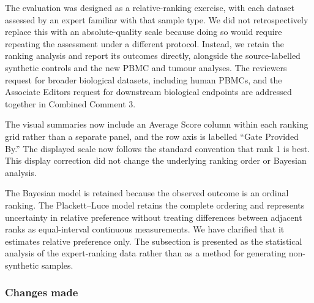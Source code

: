 \documentclass[
  11pt,
  a4paper,
]{article}
\begin{document}
The evaluation was designed as a relative-ranking exercise, with each
dataset assessed by an expert familiar with that sample type. We did not
retrospectively replace this with an absolute-quality scale because
doing so would require repeating the assessment under a different
protocol. Instead, we retain the ranking analysis and report its
outcomes directly, alongside the source-labelled synthetic controls and
the new PBMC and tumour analyses. The reviewer\textquotesingle s request
for broader biological datasets, including human PBMCs, and the
Associate Editor\textquotesingle s request for downstream biological
endpoints are addressed together in Combined Comment 3.

The visual summaries now include an Average Score column within each
ranking grid rather than a separate panel, and the row axis is labelled
``Gate Provided By.'' The displayed scale now follows the standard
convention that rank 1 is best. This display correction did not change
the underlying ranking order or Bayesian analysis.

The Bayesian model is retained because the observed outcome is an
ordinal ranking. The Plackett--Luce model retains the complete ordering
and represents uncertainty in relative preference without treating
differences between adjacent ranks as equal-interval continuous
measurements. We have clarified that it estimates relative preference
only. The subsection is presented as the statistical analysis of the
expert-ranking data rather than as a method for generating non-synthetic
samples.

\subsubsection{Changes made}\label{changes-made-5}
\end{document}
